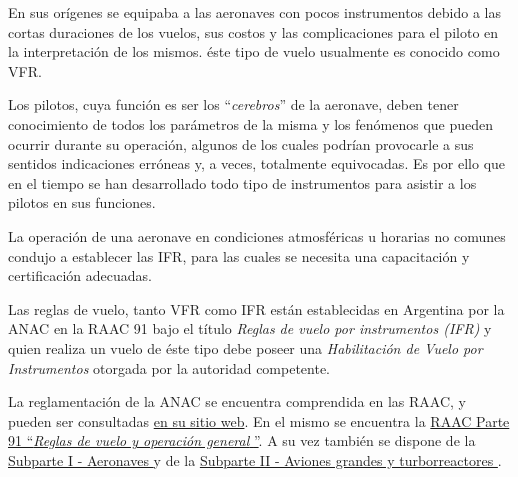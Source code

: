 
En sus or\'igenes se equipaba a las aeronaves con pocos instrumentos debido a las cortas duraciones de los vuelos, sus costos y las complicaciones para el piloto en la interpretaci\'on de los mismos. \'este tipo de vuelo usualmente es conocido como \ac{VFR}.


Los pilotos, cuya funci\'on es ser los ``\emph{cerebros}'' de la aeronave, deben tener conocimiento de todos los par\'ametros de la misma y los fen\'omenos que pueden ocurrir durante su operaci\'on, algunos de los cuales podr\'ian provocarle a sus sentidos indicaciones err\'oneas y, a veces, totalmente equivocadas. Es por ello que en el tiempo se han desarrollado todo tipo de instrumentos para asistir a los pilotos en sus funciones. 

La operaci\'on de una aeronave en condiciones atmosf\'ericas u horarias no comunes condujo a establecer las \ac{IFR}, para las cuales se necesita una capacitaci\'on y certificaci\'on adecuadas.

Las reglas de vuelo, tanto \ac{VFR} como \ac{IFR}  est\'an establecidas en Argentina por la \ac{ANAC} 
en la 
{RAAC 91} 
bajo el t\'itulo \emph{Reglas de vuelo por instrumentos (IFR)} 
y quien realiza un vuelo de \'este tipo debe poseer una 
\emph{Habilitación de Vuelo por Instrumentos} otorgada por la autoridad competente.

\begin{tcolorbox}
  La reglamentaci\'on de la ANAC se encuentra comprendida en las \ac{RAAC}, y pueden ser consultadas 
\href{http://www.anac.gov.ar/anac/web/index.php/2/120/normativa/raac-dnar}{en su sitio web}. 
En el mismo se encuentra la 
\href{http://www.anac.gov.ar/anac/web/uploads/normativa/raac/raac_vigentes/por_parte/parte-91-r-1-18.pdf}{RAAC Parte 91 ``{\it Reglas de vuelo y operación general }''}. 
A su vez tambi\'en  se dispone de la  
\href{http://www.anac.gov.ar/anac/web/uploads/normativa/raac/parte-91_subaprte1.pdf}{Subparte I - Aeronaves } 
y de la 
\href{http://www.anac.gov.ar/anac/web/uploads/normativa/raac/parte-91_subparte2.pdf}{Subparte II - Aviones grandes y turborreactores }.

\end{tcolorbox}

